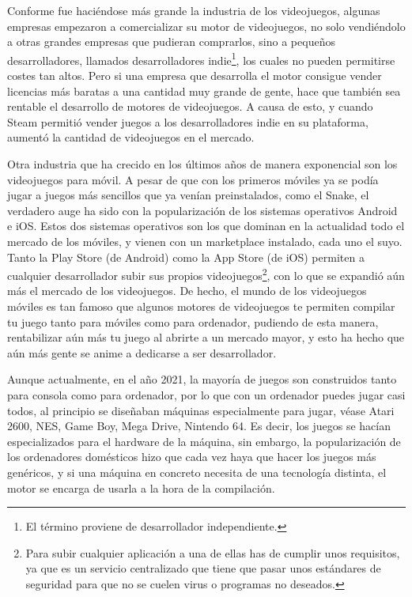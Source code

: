Conforme fue haciéndose más grande la industria de los videojuegos, algunas empresas empezaron a comercializar su motor de videojuegos, no solo vendiéndolo a otras grandes empresas que pudieran comprarlos, sino a pequeños desarrolladores, llamados desarrolladores indie\footnote{El término proviene de desarrollador independiente.}, los cuales no pueden permitirse costes tan altos. Pero si una empresa que desarrolla el motor consigue vender licencias más baratas a una cantidad muy grande de gente, hace que también sea rentable el desarrollo de motores de videojuegos. A causa de esto, y cuando Steam permitió vender juegos a los desarrolladores indie en su plataforma, aumentó la cantidad de videojuegos en el mercado.

Otra industria que ha crecido en los últimos años de manera exponencial son los videojuegos para móvil. A pesar de que con los primeros móviles ya se podía jugar a juegos más sencillos que ya venían preinstalados, como el Snake, el verdadero auge ha sido con la popularización de los sistemas operativos Android e iOS. Estos dos sistemas operativos son los que dominan en la actualidad todo el mercado de los móviles, y vienen con un marketplace instalado, cada uno el suyo. Tanto la Play Store (de Android) como la App Store (de iOS) permiten a cualquier desarrollador subir sus propios videojuegos\footnote{Para subir cualquier aplicación a una de ellas has de cumplir unos requisitos, ya que es un servicio centralizado que tiene que pasar unos estándares de seguridad para que no se cuelen virus o programas no deseados.}, con lo que se expandió aún más el mercado de los videojuegos. De hecho, el mundo de los videojuegos móviles es tan famoso que algunos motores de videojuegos te permiten compilar tu juego tanto para móviles como para ordenador, pudiendo de esta manera, rentabilizar aún más tu juego al abrirte a un mercado mayor, y esto ha hecho que aún más gente se anime a dedicarse a ser desarrollador.

Aunque actualmente, en el año 2021, la mayoría de juegos son construidos tanto para consola como para ordenador, por lo que con un ordenador puedes jugar casi todos, al principio se diseñaban máquinas especialmente para jugar, véase Atari 2600, NES, Game Boy, Mega Drive, Nintendo 64. Es decir, los juegos se hacían especializados para el hardware de la máquina, sin embargo, la popularización de los ordenadores domésticos hizo que cada vez haya que hacer los juegos más genéricos, y si una máquina en concreto necesita de una tecnología distinta, el motor se encarga de usarla a la hora de la compilación.

